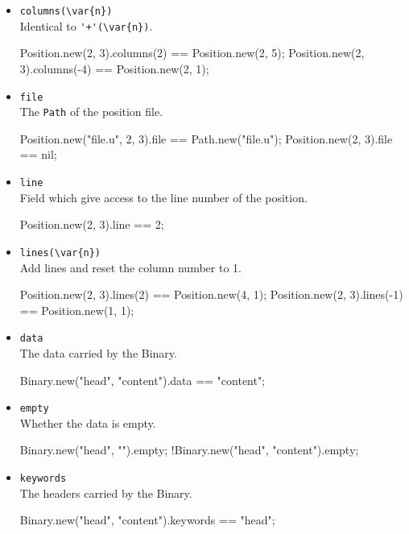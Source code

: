 \begin{itemize}
\item \lstinline|columns(\var{n})|\\
  Identical to \lstinline|'+'(\var{n})|.
\begin{urbiassert}[firstnumber=last]
Position.new(2, 3).columns(2) == Position.new(2, 5);
Position.new(2, 3).columns(-4) == Position.new(2, 1);
\end{urbiassert}

\item \lstinline|file|\\
  The \lstinline|Path| of the position file.
\begin{urbiassert}[firstnumber=last]
Position.new("file.u", 2, 3).file == Path.new("file.u");
Position.new(2, 3).file == nil;
\end{urbiassert}

\item \lstinline|line|\\
  Field which give access to the line number of the position.
\begin{urbiassert}[firstnumber=last]
Position.new(2, 3).line == 2;
\end{urbiassert}

\item \lstinline|lines(\var{n})|\\
  Add  lines and reset the column number to 1.
\begin{urbiassert}[firstnumber=last]
Position.new(2, 3).lines(2) == Position.new(4, 1);
Position.new(2, 3).lines(-1) == Position.new(1, 1);
\end{urbiassert}


\item \lstinline|data|\\
  The data carried by the Binary.
\begin{urbiassert}[firstnumber=last]
Binary.new("head", "content").data == "content";
\end{urbiassert}

\item \lstinline|empty|\\
  Whether the data is empty.
\begin{urbiassert}[firstnumber=last]
Binary.new("head", "").empty;
!Binary.new("head", "content").empty;
\end{urbiassert}

\item \lstinline|keywords|\\
  The headers carried by the Binary.
\begin{urbiassert}[firstnumber=last]
Binary.new("head", "content").keywords == "head";
\end{urbiassert}
\end{itemize}


